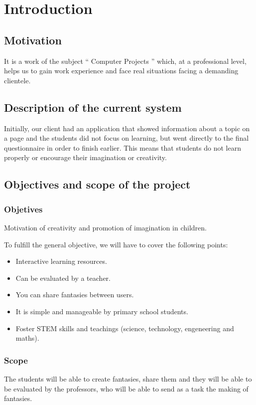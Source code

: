 \chapter{Introduction}
\section{Motivation}
It is a work of the subject `` Computer Projects '' which, at a professional level, helps us to gain work experience and face real situations facing a demanding clientele.

\section{Description of the current system}
Initially, our client had an application that showed information about a topic on a page and the students did not focus on learning, but went directly to the final questionnaire in order to finish earlier. This means that students do not learn properly or encourage their imagination or creativity.

\section{Objectives and scope of the project}
\subsection{Objetives}
Motivation of creativity and promotion of imagination in children.

To fulfill the general objective, we will have to cover the following points:
\begin{itemize}
	\item Interactive learning resources.
	\item Can be evaluated by a teacher.
	\item You can share fantasies between users.
	\item It is simple and manageable by primary school students.
	\item Foster STEM skills and teachings (science, technology, engeneering and maths).
\end{itemize}

\subsection{Scope}
The students will be able to create fantasies, share them and they will be able to be evaluated by the professors, who will be able to send as a task the making of fantasies.

